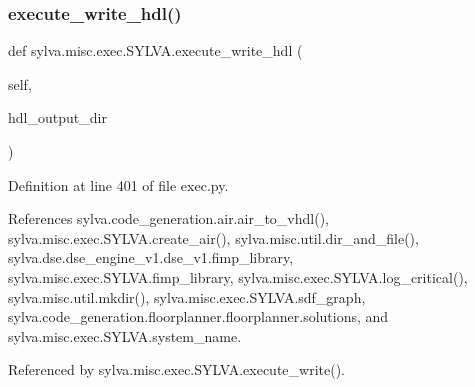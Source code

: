 \subsubsection{\texorpdfstring{execute\+\_\+write\+\_\+hdl()}{execute\_write\_hdl()}}
{\footnotesize\ttfamily def sylva.\+misc.\+exec.\+S\+Y\+L\+V\+A.\+execute\+\_\+write\+\_\+hdl (\begin{DoxyParamCaption}\item[{}]{self,  }\item[{}]{hdl\+\_\+output\+\_\+dir }\end{DoxyParamCaption})}



Definition at line 401 of file exec.\+py.



References sylva.\+code\+\_\+generation.\+air.\+air\+\_\+to\+\_\+vhdl(), sylva.\+misc.\+exec.\+S\+Y\+L\+V\+A.\+create\+\_\+air(), sylva.\+misc.\+util.\+dir\+\_\+and\+\_\+file(), sylva.\+dse.\+dse\+\_\+engine\+\_\+v1.\+dse\+\_\+v1.\+fimp\+\_\+library, sylva.\+misc.\+exec.\+S\+Y\+L\+V\+A.\+fimp\+\_\+library, sylva.\+misc.\+exec.\+S\+Y\+L\+V\+A.\+log\+\_\+critical(), sylva.\+misc.\+util.\+mkdir(), sylva.\+misc.\+exec.\+S\+Y\+L\+V\+A.\+sdf\+\_\+graph, sylva.\+code\+\_\+generation.\+floorplanner.\+floorplanner.\+solutions, and sylva.\+misc.\+exec.\+S\+Y\+L\+V\+A.\+system\+\_\+name.



Referenced by sylva.\+misc.\+exec.\+S\+Y\+L\+V\+A.\+execute\+\_\+write().


